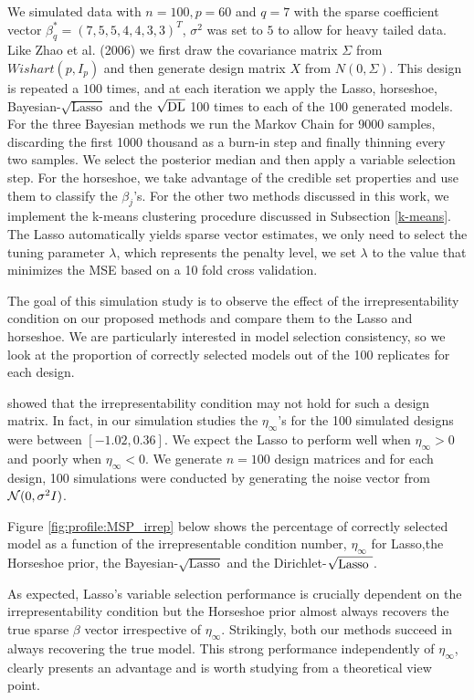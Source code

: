 \documentclass[10pt]{article}
\def\sql{$\sqrt{\text{Lasso}}$}
\def\sqdl{Dirichlet-$\sqrt{\text{\rm{Lasso} }}$}
\begin{document}
We simulated data with $n = 100, p = 60$ and $q = 7$ with the sparse coefficient vector $\beta_{q}^* = (7,5,5,4,4,3,3)^T$, $\sigma^2$ was set to $5$ to allow for heavy tailed data. Like Zhao et al. (2006) we first draw the covariance matrix $\Sigma$ from $Wishart(p, I_p)$ and then generate design matrix $X$ from $N(0,\Sigma)$. This design is repeated a $100$ times, and at each iteration we apply the Lasso, horseshoe, Bayesian-$\sqrt{\text{Lasso}}$ and the $\sqrt{\text{\rm{DL}}}$ 100 times to each of the $100$ generated models. For the three Bayesian methods we run the Markov Chain for 9000 samples, discarding the first 1000 thousand as a burn-in step and finally thinning every two samples. We select the posterior median and then apply a variable selection step. For the horseshoe, we take advantage of the credible set properties and use them to classify the $\beta_j$'s. For the other two methods discussed in this work, we implement the k-means clustering procedure discussed in Subsection \ref{k-means}. The Lasso automatically yields sparse vector estimates, we only need to select the tuning parameter $\lambda$, which represents the penalty level, we set $\lambda$ to the value that minimizes the MSE based on a 10 fold cross validation.

The goal of this simulation study is to observe the effect of the irrepresentability condition on our proposed methods and compare them to the Lasso and horseshoe. We are particularly interested in model selection consistency, so we look at the proportion of correctly selected models out of the 100 replicates for each design.

\citet{zhao2006model} showed that the irrepresentability condition may not hold for such a design matrix. In fact, in our simulation studies the $\eta_\infty$'s for the 100 simulated designs were between $[-1.02, 0.36]$. We expect the Lasso to perform well when $\eta_\infty>0$ and poorly when $\eta_\infty<0$. We generate $n = 100$ design matrices and for each design, 100 simulations were conducted by generating the noise vector from $\mathcal{N}(0, \sigma^2 I)$.

Figure \ref{fig:profile:MSP_irrep} below shows the percentage of correctly selected model as a function of the irrepresentable condition number, $\eta_\infty$ for Lasso,the Horseshoe prior, the Bayesian-\sql{} and the \sqdl{}.

As expected, Lasso's variable selection performance is crucially dependent on the irrepresentability condition but the Horseshoe prior almost always recovers the true sparse $\beta$ vector irrespective of $\eta_\infty$. Strikingly, both our methods succeed in always recovering the true model. This strong performance independently of  $\eta_\infty$, clearly presents an advantage and is worth studying from a theoretical view point.
\end{document}
